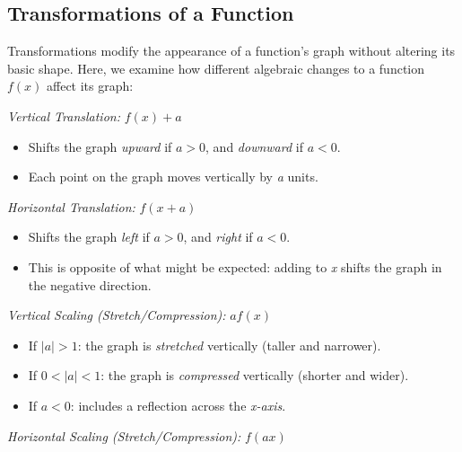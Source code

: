 \subsection{Transformations of a Function}

Transformations modify the appearance of a function's graph without altering its basic shape.
Here, we examine how different algebraic changes to a function \( f(x) \) affect its graph:
\vspace{\baselineskip}

\emph{Vertical Translation:} \( f(x) + a \)
	    
\begin{itemize}
	
	\item Shifts the graph \emph{upward} if \( a > 0 \), and \emph{downward} if \( a < 0 \).
	
	\item Each point on the graph moves vertically by \emph{a} units.

\end{itemize}

\emph{Horizontal Translation:} \( f(x + a) \)

\begin{itemize}

	\item Shifts the graph \emph{left} if \( a > 0 \), and \emph{right} if \( a < 0 \).

	\item This is opposite of what might be expected: adding to \emph{x} shifts the graph in the negative 
	      direction.

\end{itemize}

\emph{Vertical Scaling (Stretch/Compression):} \( a f(x) \)

\begin{itemize}
	
	\item If \( |a| > 1 \): the graph is \emph{stretched} vertically (taller and narrower).
	
	\item If \( 0 < |a| < 1 \): the graph is \emph{compressed} vertically (shorter and wider).
	
	\item If \( a < 0 \): includes a reflection across the \emph{x-axis}.

\end{itemize}

\emph{Horizontal Scaling (Stretch/Compression):} \( f(a x) \)

